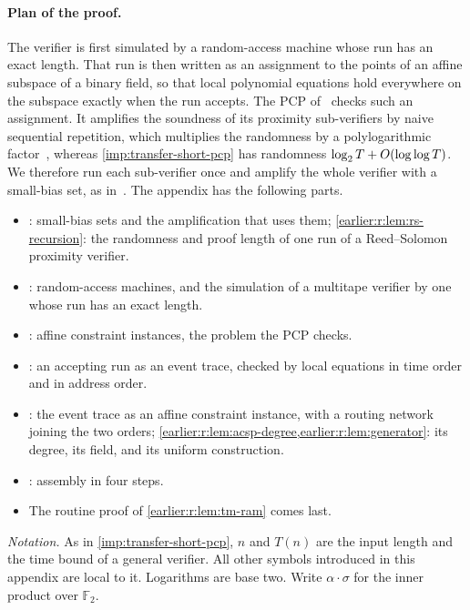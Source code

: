 \paragraph{Plan of the proof.} The verifier is first simulated by a
random-access machine whose run has an exact length. That run is then
written as an assignment to the points of an affine subspace of a
binary field, so that local polynomial equations hold everywhere on the
subspace exactly when the run accepts. The PCP of~\cite{BCGT13} checks
such an assignment. It amplifies the soundness of its proximity
sub-verifiers by naive sequential repetition, which multiplies the
randomness by a polylogarithmic factor~\cite[Remark~11.2 and
Lemmas~C.6--C.8]{BCGT13}, whereas \cref{imp:transfer-short-pcp} has randomness
\(\log_2 T+O(\log\log T)\). We therefore run each sub-verifier once and
amplify the whole verifier with a small-bias set, as
in~\cite[Section~4.4]{BV14}. The appendix has the following parts.
\begin{itemize}
\item {}: small-bias sets and the
amplification that uses them; \cref{earlier:r:lem:rs-recursion}: the randomness
and proof length of one run of a Reed--Solomon proximity verifier.
\item {}: random-access machines, and the
simulation of a multitape verifier by one whose run has an exact
length.
\item {}: affine constraint instances, the problem the PCP
checks.
\item {}: an accepting run as an event trace, checked by
local equations in time order and in address order.
\item {}: the event trace as an affine constraint
instance, with a routing network joining the two orders;
\cref{earlier:r:lem:acsp-degree,earlier:r:lem:generator}: its degree, its field, and its
uniform construction.
\item {}: assembly in four steps.
\item The routine proof of \cref{earlier:r:lem:tm-ram} comes last.
\end{itemize}

\emph{Notation.} As in \cref{imp:transfer-short-pcp}, \(n\) and \(T(n)\) are the
input length and the time bound of a general verifier. All other
symbols introduced in this appendix are local to it. Logarithms are
base two. Write \(\alpha\cdot\sigma\) for the inner product over
\(\mathbb F_2\).

